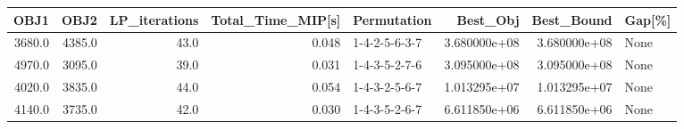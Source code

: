 \begin{tabular}{rrrrlrrl}
\toprule
   OBJ1 &    OBJ2 &  LP\_iterations &  Total\_Time\_MIP[s] &    Permutation &      Best\_Obj &    Best\_Bound & Gap[\%] \\
\midrule
 3680.0 &  4385.0 &           43.0 &              0.048 &  1-4-2-5-6-3-7 &  3.680000e+08 &  3.680000e+08 &   None \\
 4970.0 &  3095.0 &           39.0 &              0.031 &  1-4-3-5-2-7-6 &  3.095000e+08 &  3.095000e+08 &   None \\
 4020.0 &  3835.0 &           44.0 &              0.054 &  1-4-3-2-5-6-7 &  1.013295e+07 &  1.013295e+07 &   None \\
 4140.0 &  3735.0 &           42.0 &              0.030 &  1-4-3-5-2-6-7 &  6.611850e+06 &  6.611850e+06 &   None \\
\bottomrule
\end{tabular}
